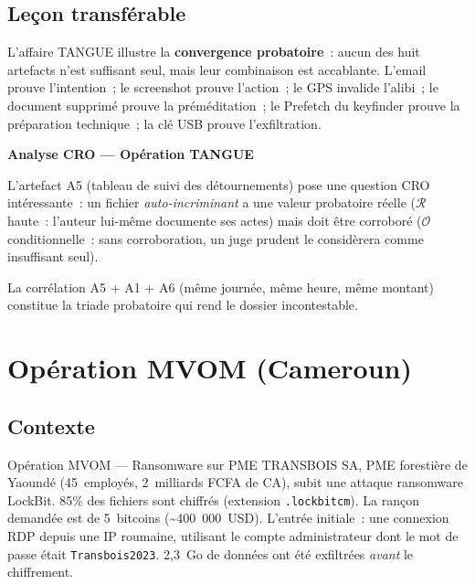 \subsection{Leçon transférable}

L'affaire TANGUE illustre la \textbf{convergence probatoire}~: aucun des
huit artefacts n'est suffisant seul, mais leur combinaison est accablante.
L'email prouve l'intention~; le screenshot prouve l'action~; le GPS
invalide l'alibi~; le document supprimé prouve la préméditation~; le
Prefetch du keyfinder prouve la préparation technique~; la clé USB prouve
l'exfiltration.

\begin{boxCRO}
\textbf{Analyse CRO --- Opération TANGUE}

L'artefact A5 (tableau de suivi des détournements) pose une question
CRO intéressante~: un fichier \emph{auto-incriminant} a une valeur
probatoire réelle ($\mathcal{R}$ haute~: l'auteur lui-même documente
ses actes) mais doit être corroboré ($\mathcal{O}$ conditionnelle~: sans
corroboration, un juge prudent le considèrera comme insuffisant seul).

La corrélation A5 + A1 + A6 (même journée, même heure, même montant)
constitue la triade probatoire qui rend le dossier incontestable.
\end{boxCRO}

\section{Opération MVOM (Cameroun)}
\label{sec:mvom}

\subsection{Contexte}

\begin{boxscenario}{Opération MVOM --- Ransomware sur PME}
TRANSBOIS SA, PME forestière de Yaoundé (45~employés, 2~milliards FCFA
de CA), subit une attaque ransomware LockBit. 85\% des fichiers sont chiffrés
(extension \texttt{.lockbitcm}). La rançon demandée est de 5~bitcoins
(\textasciitilde 400~000~USD). L'entrée initiale~: une connexion RDP
depuis une IP roumaine, utilisant le compte administrateur dont le mot de
passe était \texttt{Transbois2023}. 2,3~Go de données ont été exfiltrées
\emph{avant} le chiffrement.
\end{boxscenario}

